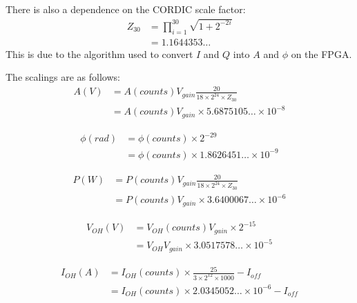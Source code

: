 \documentclass[12pt,a4paper]{article}
\begin{document}
There is also a dependence on the CORDIC scale factor:
\begin{equation}
  \label{equ:cordic}
  \begin{split}
    Z_{30} &= \prod_{i=1}^{30}\sqrt{1 + 2^{-2i}} \\
    &= 1.1644353\ldots
  \end{split}
\end{equation}
This is due to the algorithm used to convert $I$ and $Q$ into $A$ and $\phi$ on the FPGA\@.

The scalings are as follows:
\begin{equation}
  \label{equ:avolts}
  \begin{split}
    A(V) &= A(counts) V_{gain} \frac{20}{18 \times 2^{24} \times Z_{30}} \\
    &= A(counts) V_{gain} \times 5.6875105\ldots \times 10^{-8}
  \end{split}
\end{equation}

\begin{equation}
  \label{equ:phirad}
  \begin{split}
    \phi(rad) &= \phi(counts) \times 2^{-29} \\
    &= \phi(counts) \times 1.8626451\ldots \times 10^{-9}
  \end{split}
\end{equation}

\begin{equation}
  \label{equ:pwatts}
  \begin{split}
    P(W) &= P(counts) V_{gain} \frac{20}{18 \times 2^{24} \times Z_{30}} \\
    &= P(counts) V_{gain} \times 3.6400067\ldots \times 10^{-6}
  \end{split}
\end{equation}

\begin{equation}
  \label{equ:vdcvolts}
  \begin{split}
    V_{OH}(V) &= V_{OH}(counts) V_{gain} \times 2^{-15} \\
    &= V_{OH} V_{gain} \times 3.0517578\ldots \times 10^{-5}
  \end{split}
\end{equation}

\begin{equation}
  \label{equ:curramps}
  \begin{split}
    I_{OH}(A) &= I_{OH}(counts) \times \frac{25}{3 \times 2^{12} \times 1000} - I_{off} \\
    &= I_{OH}(counts) \times 2.0345052\ldots \times 10^{-6} - I_{off}
  \end{split}
\end{equation}
\end{document}
